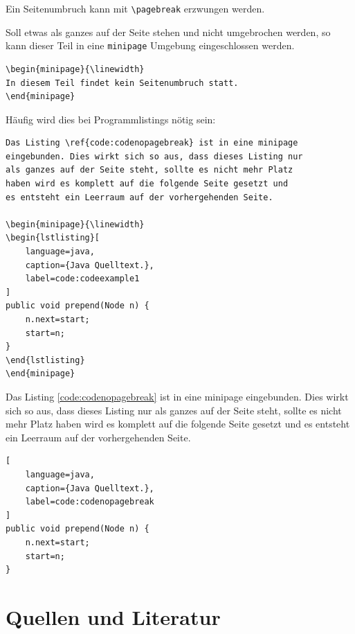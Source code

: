 Ein Seitenumbruch kann mit \lstinline{\pagebreak} erzwungen werden.

Soll etwas als ganzes auf der Seite stehen und nicht umgebrochen werden, so kann dieser Teil in eine \lstinline{minipage} Umgebung eingeschlossen werden.

\begin{Verbatim}[frame=single]
\begin{minipage}{\linewidth}
In diesem Teil findet kein Seitenumbruch statt.
\end{minipage}
\end{Verbatim}

Häufig wird dies bei Programmlistings nötig sein:

\begin{Verbatim}[frame=single]
Das Listing \ref{code:codenopagebreak} ist in eine minipage 
eingebunden. Dies wirkt sich so aus, dass dieses Listing nur 
als ganzes auf der Seite steht, sollte es nicht mehr Platz 
haben wird es komplett auf die folgende Seite gesetzt und 
es entsteht ein Leerraum auf der vorhergehenden Seite.

\begin{minipage}{\linewidth}
\begin{lstlisting}[
	language=java,
	caption={Java Quelltext.},
	label=code:codeexample1
]
public void prepend(Node n) {
	n.next=start;
	start=n;
}
\end{lstlisting}
\end{minipage}
\end{Verbatim}

Das Listing \ref{code:codenopagebreak} ist in eine minipage eingebunden.
Dies wirkt sich so aus, dass dieses Listing nur als ganzes auf der Seite steht, sollte es nicht mehr Platz haben wird es komplett auf die folgende Seite gesetzt und es entsteht ein Leerraum auf der vorhergehenden Seite.

\begin{minipage}{\linewidth}
\begin{lstlisting}[
	language=java,
	caption={Java Quelltext.},
	label=code:codenopagebreak
]
public void prepend(Node n) {
	n.next=start;
	start=n;
}
\end{lstlisting}
\end{minipage}


\section{Quellen und Literatur}

